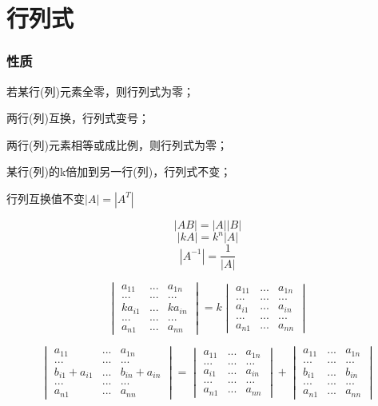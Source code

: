 
\chapter{行列式}

\subsection{性质}

若某行(列)元素全零，则行列式为零；

两行(列)互换，行列式变号；

两行(列)元素相等或成比例，则行列式为零；

某行(列)的k倍加到另一行(列)，行列式不变；

行列互换值不变\(|A| = |A^T|\)

\[|AB| = |A||B|\]
\[|kA| = k^n|A|\]
\[|A^{-1}| = \dfrac{1}{|A|}\]

\[\begin{vmatrix}
a_{11} & ... & a_{1n} \\
... & ... & ... \\
ka_{i1} & ... & ka_{in} \\
... & ... & ... \\
a_{n1} & ... & a_{nn}
\end{vmatrix} = k
\begin{vmatrix}
a_{11} & ... & a_{1n} \\
... & ... & ... \\
a_{i1} & ... & a_{in} \\
... & ... & ... \\
a_{n1} & ... & a_{nn}
\end{vmatrix}\]

\[\begin{vmatrix}
a_{11} & ... & a_{1n} \\
... & ... & ... \\
b_{i1} + a_{i1} & ... & b_{in} + a_{in} \\
... & ... & ... \\
a_{n1} & ... & a_{nn}
\end{vmatrix} = 
\begin{vmatrix}
a_{11} & ... & a_{1n} \\
... & ... & ... \\
a_{i1} & ... & a_{in} \\
... & ... & ... \\
a_{n1} & ... & a_{nn}
\end{vmatrix} + 
\begin{vmatrix}
a_{11} & ... & a_{1n} \\
... & ... & ... \\
b_{i1} & ... & b_{in} \\
... & ... & ... \\
a_{n1} & ... & a_{nn}
\end{vmatrix}\]

